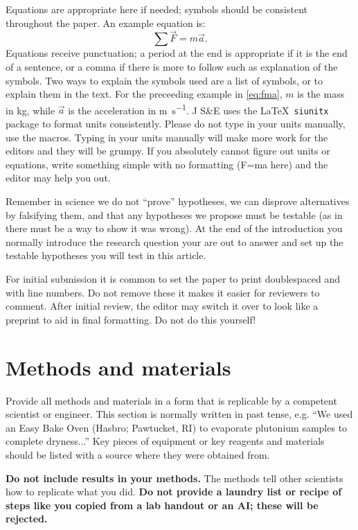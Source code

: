 \documentclass[amsmath,amssymb,aps,endfloats,linenumbers]{revtex4-2}
\begin{document}
Equations are appropriate here if needed; symbols should be consistent throughout the paper. An example equation is:
\begin{equation}
\sum \vec{F} = m \vec{a}.
\label{eq:fma} %
\end{equation}
Equations receive punctuation; a period at the end is appropriate if it is the end of a sentence, or a comma if there is more to follow such as explanation of the symbols. Two ways to explain the symbols used are a list of symbols, or to explain them in the text. For the preceeding example in \cref{eq:fma}, $m$ is the mass in \unit{\kilo\gram}, while $\vec{a}$ is the acceleration in \unit{\meter\per\second}. J S\&E uses the \LaTeX\ \texttt{siunitx} package to format units consistently. Please do not type in your units manually, use the macros. Typing in your units manually will make more work for the editors and they will be grumpy. If you absolutely cannot figure out units or equations, write something simple with no formatting (F=ma here) and the editor may help you out. 

Remember in science we do not ``prove'' hypotheses, we can disprove alternatives by falsifying them, and that any hypotheses we propose must be testable (as in there must be a way to show it was wrong). At the end of the introduction you normally introduce the research question your are out to answer and set up the testable hypotheses you will test in this article. 

For initial submission it is common to set the paper to print doublespaced and with line numbers. Do not remove these it makes it easier for reviewers to comment. After initial review, the editor may switch it over to look like a preprint to aid in final formatting. Do not do this yourself! 






\section{Methods and materials}
Provide all methods and materials in a form that is replicable by a competent scientist or engineer. This section is normally written in past tense, e.g. ``We used an Easy Bake Oven (Hasbro; Pawtucket, RI) to evaporate plutonium samples to complete dryness...'' Key pieces of equipment or key reagents and materials should be listed with a source where they were obtained from. 

\textbf{Do not include results in your methods.} The methods tell other scientists how to replicate what you did. \textbf{Do not provide a laundry list or recipe of steps like you copied from a lab handout or an AI; these will be rejected.} 
\end{document}

